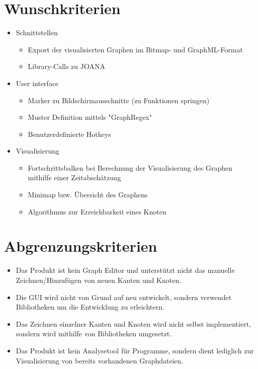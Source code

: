 \section{Wunschkriterien}

\begin{itemize}
\item Schnittstellen
\begin{itemize}
\item Export der visualisierten Graphen im Bitmap- und GraphML-Format
\item Library-Calls zu JOANA
\end{itemize}
\item User interface
\begin{itemize}
\item Marker zu Bildschirmausschnitte (zu Funktionen springen)
\item Muster Definition mittels "GraphRegex"
\item Benutzerdefinierte Hotkeys
\end{itemize}
\item Visualisierung
\begin{itemize}
\item Fortschrittsbalken bei Berechnung der Visualisierung des Graphen mithilfe einer Zeitabschätzung
\item Minimap bzw. Übersicht des Graphens
\item Algorithmus zur Erreichbarkeit eines Knoten
\end{itemize}
\end{itemize}

\section{Abgrenzungskriterien}

\begin{itemize}
\item Das Produkt ist kein Graph Editor und unterstützt nicht das manuelle Zeichnen/Hinzufügen von neuen Kanten und Knoten.
\item Die GUI wird nicht von Grund auf neu entwickelt, sondern verwendet Bibliotheken um die Entwicklung zu erleichtern. 
\item Das Zeichnen einzelner Kanten und Knoten wird nicht selbst implementiert, sondern wird mithilfe von Bibliotheken umgesetzt.
\item Das Produkt ist kein Analysetool für Programme, sondern dient lediglich zur Visualisierung von bereits vorhandenen Graphdateien.
\end{itemize}